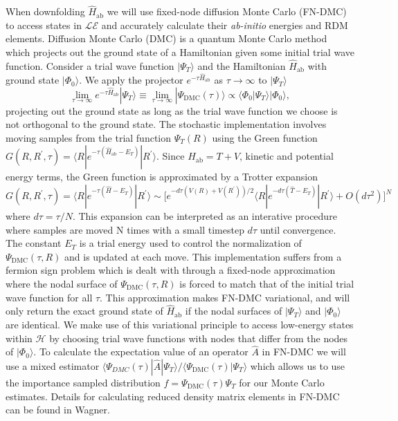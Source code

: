 \documentclass[12pt]{article}
\begin{document}
When downfolding $\hat{H}_\text{ab}$ we will use fixed-node diffusion Monte Carlo (FN-DMC) to access states in $\mathcal{LE}$ and accurately calculate their \textit{ab-initio} energies and RDM elements.
Diffusion Monte Carlo (DMC) is a quantum Monte Carlo method which projects out the ground state of a Hamiltonian given some initial trial wave function.
Consider a trial wave function $|\Psi_T\rangle$ and the Hamiltonian $\hat{H}_\text{ab}$ with ground state $|\Phi_0\rangle$. We apply the projector $e^{-\tau \hat{H}_\text{ab}}$ as $\tau \rightarrow \infty$ to $|\Psi_T \rangle$
\begin{equation}
\lim_{\tau \rightarrow \infty} e^{-\tau \hat{H}_\text{ab}} |\Psi_T\rangle 
\equiv \lim_{\tau \rightarrow \infty} |\Psi_\text{DMC}(\tau)\rangle \propto \langle \Phi_0|\Psi_T\rangle |\Phi_0\rangle,
\end{equation}
projecting out the ground state as long as the trial wave function we choose is not orthogonal to the ground state. 
The stochastic implementation involves moving samples from the trial function $\Psi_T(R)$ using the Green function $G(R, R^\prime, \tau) = \langle R | e^{-\tau(\hat{H}_\text{ab} - E_T)} | R^\prime \rangle$. Since $H_\text{ab} = T + V$, kinetic and potential energy terms, the Green function is approximated by a Trotter expansion $G(R, R^\prime, \tau) = \langle R | e^{-\tau(\hat{H} - E_T)} | R^\prime \rangle \sim \Big[e^{-d\tau(V(R) + V(R^\prime))/2} \langle R| e^{-d\tau(\hat{T} - E_T)}|R^\prime \rangle + O(d\tau^2) \Big]^N $ where $d\tau = \tau/N$.
This expansion can be interpreted as an interative procedure where samples are moved N times with a small timestep $d\tau$ until convergence.
The constant $E_T$ is a trial energy used to control the normalization of $\Psi_\text{DMC}(\tau, R)$ and is updated at each move.
This implementation suffers from a fermion sign problem which is dealt with through a fixed-node approximation where the nodal surface of $\Psi_\text{DMC}(\tau, R)$ is forced to match that of the initial trial wave function for all $\tau$.
This approximation makes FN-DMC variational, and will only return the exact ground state of $\hat{H}_\text{ab}$ if the nodal surfaces of $|\Psi_T\rangle$ and $|\Phi_0\rangle$ are identical.
We make use of this variational principle to access low-energy states within $\mathcal{H}$ by choosing trial wave functions with nodes that differ from the nodes of $|\Phi_0 \rangle$.
To calculate the expectation value of an operator $\hat{A}$ in FN-DMC we will use a mixed estimator $\langle \Psi_{DMC}(\tau) |\hat{A} | \Psi_T \rangle/\langle \Psi_\text{DMC}(\tau) | \Psi_T \rangle$ which allows us to use the importance sampled distribution $f = \Psi_\text{DMC}(\tau)\Psi_T$ for our Monte Carlo estimates.
Details for calculating reduced density matrix elements in FN-DMC can be found in Wagner.
\end{document}
